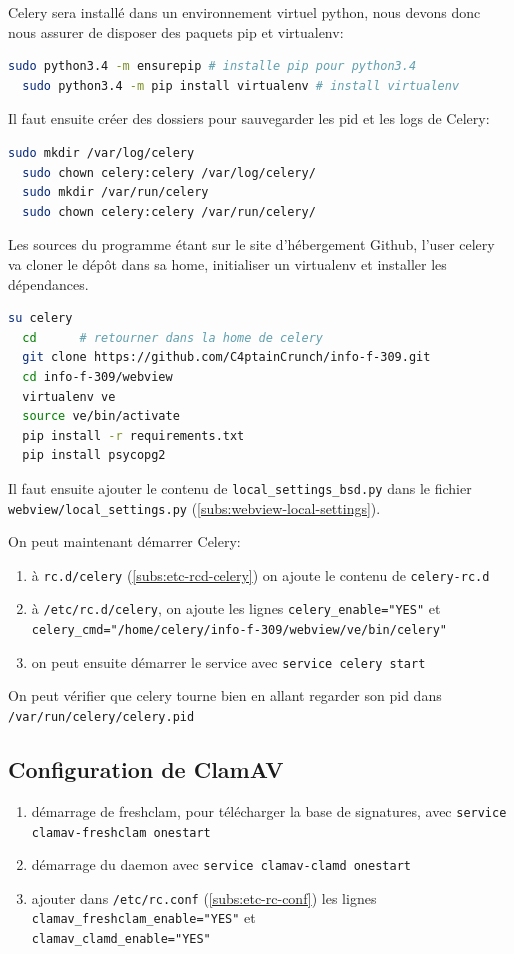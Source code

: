 \documentclass[10pt,a4paper]{article}
\begin{document}
Celery sera installé dans un environnement virtuel python, nous devons donc nous assurer de disposer des paquets pip et virtualenv:
\begin{lstlisting}[language=bash]
  sudo python3.4 -m ensurepip # installe pip pour python3.4
  sudo python3.4 -m pip install virtualenv # install virtualenv
\end{lstlisting}

Il faut ensuite créer des dossiers pour sauvegarder les pid et les logs de Celery:
\begin{lstlisting}[language=bash]
  sudo mkdir /var/log/celery
  sudo chown celery:celery /var/log/celery/
  sudo mkdir /var/run/celery
  sudo chown celery:celery /var/run/celery/
\end{lstlisting}

Les sources du programme étant sur le site d'hébergement Github, l'user celery va cloner le dépôt dans sa home, initialiser un virtualenv et installer les dépendances.
\begin{lstlisting}[language=bash]
  su celery
  cd      # retourner dans la home de celery
  git clone https://github.com/C4ptainCrunch/info-f-309.git
  cd info-f-309/webview
  virtualenv ve
  source ve/bin/activate
  pip install -r requirements.txt
  pip install psycopg2
\end{lstlisting}

Il faut ensuite ajouter le contenu de \texttt{local\_settings\_bsd.py} dans le fichier \texttt{webview/local\_settings.py} (\ref{subs:webview-local-settings}).

On peut maintenant démarrer Celery:
\begin{enumerate}
  \item à \texttt{rc.d/celery} (\ref{subs:etc-rcd-celery}) on ajoute le contenu de \texttt{celery-rc.d}
  \item à \texttt{/etc/rc.d/celery}, on ajoute les lignes \texttt{celery\_enable="YES"} et\\ \texttt{celery\_cmd="/home/celery/info-f-309/webview/ve/bin/celery"}
  \item on peut ensuite démarrer le service avec \texttt{service celery start}
\end{enumerate}

On peut vérifier que celery tourne bien en allant regarder son pid dans \texttt{/var/run/celery/celery.pid}

\subsection{Configuration de ClamAV}
\begin{enumerate}
  \item démarrage de freshclam, pour télécharger la base de signatures, avec \texttt{service clamav-freshclam onestart}
  \item démarrage du daemon avec \texttt{service clamav-clamd onestart}
  \item ajouter dans \texttt{/etc/rc.conf} (\ref{subs:etc-rc-conf}) les lignes \texttt{clamav\_freshclam\_enable="YES"} et\\ \texttt{clamav\_clamd\_enable="YES"}
\end{enumerate}
\end{document}
